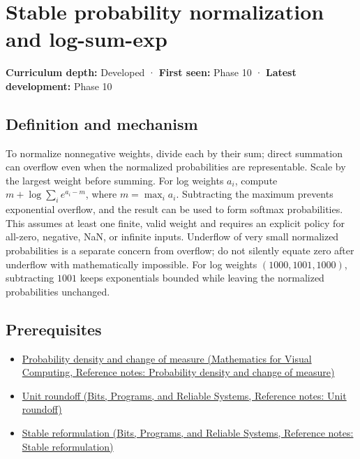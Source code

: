 \hypertarget{appendix-d580b422240f}{}\label{referencestart:appendix-d580b422240f}
\section{Stable probability normalization and log-sum-exp}\label{appendix-d580b422240f-stable-probability-normalization-and-log-sum-exp}

\textbf{Curriculum depth:} Developed · \textbf{First seen:} Phase 10 · \textbf{Latest development:} Phase 10

\begin{allmightroledefinition}

\subsection{Definition and mechanism}\label{appendix-d580b422240f-definition-and-mechanism}

To normalize nonnegative weights, divide each by their sum; direct summation can overflow even when the normalized probabilities are representable. Scale by the largest weight before summing. For log weights \(a_i\), compute \(m+\log\sum_i e^{a_i-m}\), where \(m=\max_i a_i\). Subtracting the maximum prevents exponential overflow, and the result can be used to form softmax probabilities. This assumes at least one finite, valid weight and requires an explicit policy for all-zero, negative, NaN, or infinite inputs. Underflow of very small normalized probabilities is a separate concern from overflow; do not silently equate zero after underflow with mathematically impossible. For log weights \((1000,1001,1000)\), subtracting \(1001\) keeps exponentials bounded while leaving the normalized probabilities unchanged.

\end{allmightroledefinition}

\subsection{Prerequisites}\label{appendix-d580b422240f-prerequisites}

\begin{itemize}
\tightlist
\item
  \href{../02-Mathematics-for-Visual-Computing/main.pdf\#nameddest=appendix-4815cd87ab8b}{Probability density and change of measure (Mathematics for Visual Computing, Reference notes: Probability density and change of measure)}
\item
  \href{../01-Bits-Programs-and-Reliable-Systems/main.pdf\#nameddest=appendix-bc44f7b42f42}{Unit roundoff (Bits, Programs, and Reliable Systems, Reference notes: Unit roundoff)}
\item
  \href{../01-Bits-Programs-and-Reliable-Systems/main.pdf\#nameddest=appendix-d7f8ba961670}{Stable reformulation (Bits, Programs, and Reliable Systems, Reference notes: Stable reformulation)}
\end{itemize}

